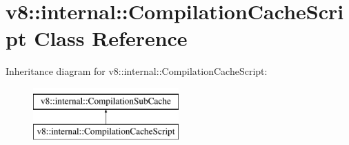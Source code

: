 \hypertarget{classv8_1_1internal_1_1CompilationCacheScript}{}\section{v8\+:\+:internal\+:\+:Compilation\+Cache\+Script Class Reference}
\label{classv8_1_1internal_1_1CompilationCacheScript}
Inheritance diagram for v8\+:\+:internal\+:\+:Compilation\+Cache\+Script\+:\begin{figure}[H]
\begin{center}
\leavevmode
\includegraphics[height=2.000000cm]{classv8_1_1internal_1_1CompilationCacheScript}
\end{center}
\end{figure}
